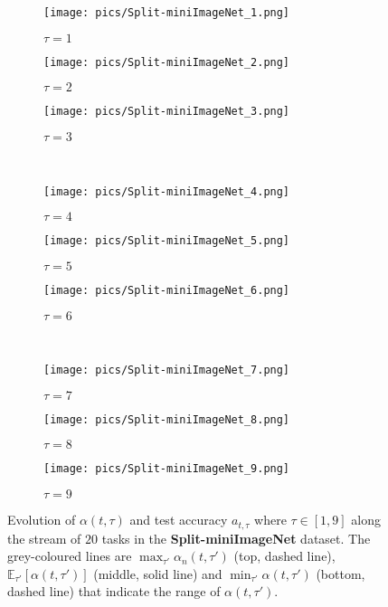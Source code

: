 \documentclass{article} \usepackage{collas2022_conference,times}
\begin{document}
    \begin{figure*}[t!]
        \centering
        \begin{subfigure}[b]{0.32\textwidth}
            \texttt{[image: pics/Split-miniImageNet\_1.png]}\caption{$\tau=1$}
        \end{subfigure}
        \hfill
        \begin{subfigure}[b]{0.32\textwidth}
            \texttt{[image: pics/Split-miniImageNet\_2.png]}\caption{$\tau=2$}
        \end{subfigure}
        \hfill
        \begin{subfigure}[b]{0.32\textwidth}
            \texttt{[image: pics/Split-miniImageNet\_3.png]}\caption{$\tau=3$}
        \end{subfigure}
        \\
        \begin{subfigure}[b]{0.32\textwidth}
            \texttt{[image: pics/Split-miniImageNet\_4.png]}\caption{$\tau=4$}
        \end{subfigure}
        \hfill
        \begin{subfigure}[b]{0.32\textwidth}
            \texttt{[image: pics/Split-miniImageNet\_5.png]}\caption{$\tau=5$}
        \end{subfigure}
        \hfill
        \begin{subfigure}[b]{0.32\textwidth}
            \texttt{[image: pics/Split-miniImageNet\_6.png]}\caption{$\tau=6$}
        \end{subfigure}
        \\
        \begin{subfigure}[b]{0.32\textwidth}
            \texttt{[image: pics/Split-miniImageNet\_7.png]}\caption{$\tau=7$}
        \end{subfigure}
        \hfill
        \begin{subfigure}[b]{0.32\textwidth}
            \texttt{[image: pics/Split-miniImageNet\_8.png]}\caption{$\tau=8$}
        \end{subfigure}
        \hfill
        \begin{subfigure}[b]{0.32\textwidth}
            \texttt{[image: pics/Split-miniImageNet\_9.png]}\caption{$\tau=9$}
        \end{subfigure}
        \caption{Evolution of $\alpha(t,\tau)$ and test accuracy $a_{t,\tau}$ where $\tau \in [1,9]$ along the stream of $20$ tasks in the \textbf{Split-miniImageNet} dataset. The grey-coloured lines are $\max_{\tau'} \alpha_n(t,\tau')$  (top, dashed line), $\mathbb{E}_{\tau'} [\alpha(t,\tau')]$  (middle, solid line) and $\min_{\tau'} \alpha(t,\tau')$  (bottom, dashed line) that indicate the range of $\alpha(t,\tau')$. }
        \label{alpha_imagenet_app}
    \end{figure*}
\end{document}
